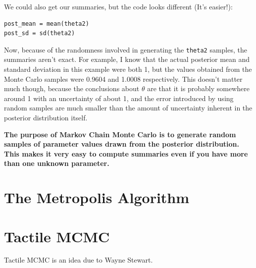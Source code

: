 We could also get our summaries, but the code looks different (It's easier!):
\begin{verbatim}
post_mean = mean(theta2)
post_sd = sd(theta2)
\end{verbatim}
Now, because of the randomness involved in generating the {\tt theta2} samples,
the summaries aren't exact. For example, I know that the actual posterior mean
and standard deviation in this example were both 1, but the values obtained
from the Monte Carlo samples were 0.9604 and 1.0008 respectively. This doesn't
matter much though, because the conclusions about $\theta$ are that it is probably
somewhere around 1 with an uncertainty of about 1, and the error introduced by
using random samples are much smaller than the amount of uncertainty inherent
in the posterior distribution itself.

\begin{framed}
{\bf
The purpose of Markov Chain Monte Carlo is to generate random samples of
parameter values drawn from the posterior distribution. This makes it very easy
to compute summaries even if you have more than one unknown parameter.}
\end{framed}


\section{The Metropolis Algorithm}

\section{Tactile MCMC}

Tactile MCMC is an idea due to Wayne Stewart.
